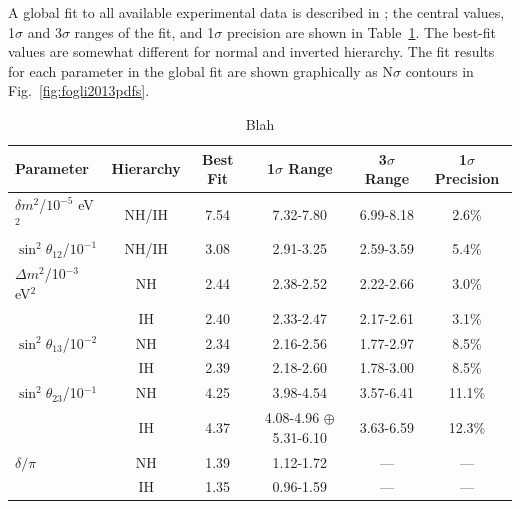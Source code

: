 \documentclass[letterpaper,11pt]{article}
\begin{document}
A global fit to all available experimental
data is described in \cite{Capozzi:2013csa}; the central values, 1$\sigma$ 
and 3$\sigma$ ranges of the fit, and 1$\sigma$ precision are shown in 
Table~\ref{tab:Capozzi2013}. 
The best-fit values are somewhat different for normal and inverted hierarchy.
The fit results for each parameter in the global fit are shown graphically as
N$\sigma$ contours in Fig.~\ref{fig:fogli2013pdfs}.
%
\begin{table}[!htb]
\caption{Blah}
\begin{center}
\begin{tabular}{l|c|c|c|c|c}
\hline
Parameter & Hierarchy & Best Fit & 1$\sigma$ Range & 3$\sigma$ Range & 1$\sigma$ Precision\\ \hline\hline
$\delta m^2$/$10^{-5}$ eV$^2$ & NH/IH & 7.54 & 7.32-7.80 & 6.99-8.18 & 2.6\% \\ \hline
$\sin^2 \theta_{12}$/$10^{-1}$& NH/IH & 3.08 & 2.91-3.25 & 2.59-3.59 & 5.4\% \\ \hline
$\Delta m^2$/10$^{-3}$ eV$^2$ & NH & 2.44 & 2.38-2.52 & 2.22-2.66 & 3.0\% \\
                              & IH & 2.40 & 2.33-2.47 & 2.17-2.61 & 3.1\% \\ \hline
$\sin^2 \theta_{13}$/10$^{-2}$ & NH & 2.34 & 2.16-2.56 & 1.77-2.97 & 8.5\% \\
                               & IH & 2.39 & 2.18-2.60 & 1.78-3.00 & 8.5\% \\ \hline
$\sin^2 \theta_{23}$/10$^{-1}$ & NH & 4.25 & 3.98-4.54 &   3.57-6.41 & 11.1\% \\
                               & IH & 4.37 & 4.08-4.96 $\oplus$ 5.31-6.10 & 3.63-6.59 & 12.3\% \\ \hline
$\delta/\pi$                   & NH & 1.39 & 1.12-1.72 & --- & --- \\
                               & IH & 1.35 & 0.96-1.59 & --- & --- \\\hline 
\end{tabular}
\end{center}
\label{tab:Capozzi2013}
\end{table}
%
\end{document}
